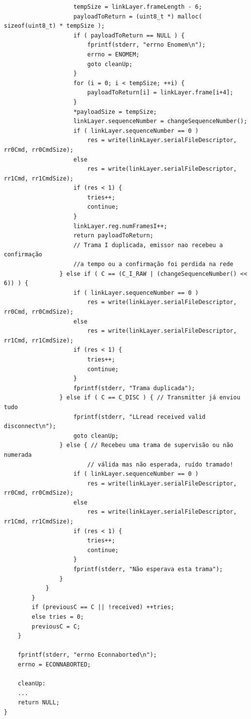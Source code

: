 \documentclass[a4paper]{article}
\begin{document}
\begin{verbatim}
                    tempSize = linkLayer.frameLength - 6;
                    payloadToReturn = (uint8_t *) malloc( sizeof(uint8_t) * tempSize );
                    if ( payloadToReturn == NULL ) {
                        fprintf(stderr, "errno Enomem\n");
                        errno = ENOMEM;
                        goto cleanUp;
                    }
                    for (i = 0; i < tempSize; ++i) {
                        payloadToReturn[i] = linkLayer.frame[i+4];
                    }
                    *payloadSize = tempSize;
                    linkLayer.sequenceNumber = changeSequenceNumber();
                    if ( linkLayer.sequenceNumber == 0 )
                        res = write(linkLayer.serialFileDescriptor, rr0Cmd, rr0CmdSize);
                    else
                        res = write(linkLayer.serialFileDescriptor, rr1Cmd, rr1CmdSize);
                    if (res < 1) {
                        tries++;
                        continue;
                    }
                    linkLayer.reg.numFramesI++;
                    return payloadToReturn;
                    // Trama I duplicada, emissor nao recebeu a confirmação
                    //a tempo ou a confirmação foi perdida na rede
                } else if ( C == (C_I_RAW | (changeSequenceNumber() << 6)) ) {
                    if ( linkLayer.sequenceNumber == 0 )
                        res = write(linkLayer.serialFileDescriptor, rr0Cmd, rr0CmdSize);
                    else
                        res = write(linkLayer.serialFileDescriptor, rr1Cmd, rr1CmdSize);
                    if (res < 1) {
                        tries++;
                        continue;
                    }
                    fprintf(stderr, "Trama duplicada");
                } else if ( C == C_DISC ) { // Transmitter já enviou tudo
                    fprintf(stderr, "LLread received valid disconnect\n");
                    goto cleanUp;
                } else { // Recebeu uma trama de supervisão ou não numerada
                        // válida mas não esperada, ruído tramado!
                    if ( linkLayer.sequenceNumber == 0 )
                        res = write(linkLayer.serialFileDescriptor, rr0Cmd, rr0CmdSize);
                    else
                        res = write(linkLayer.serialFileDescriptor, rr1Cmd, rr1CmdSize);
                    if (res < 1) {
                        tries++;
                        continue;
                    }
                    fprintf(stderr, "Não esperava esta trama");
                }
            }
        }
        if (previousC == C || !received) ++tries;
        else tries = 0;
        previousC = C;
    }

    fprintf(stderr, "errno Econnaborted\n");
    errno = ECONNABORTED;

    cleanUp:
    ...
    return NULL;
}
\end{verbatim}
\end{document}
